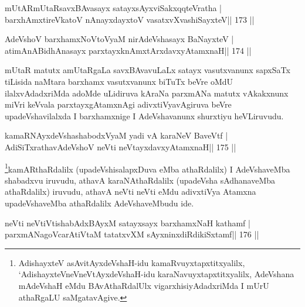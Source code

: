 
\begin{shl}
mUtARmUtaRsavxBAvasayx satayxsAyx\s\s viSakxqqteVratha |
barxhAmxtireVkatoV nAnayxdayxtoV vasatxvXvashiSayxteV\hfill || 173 ||
\end{shl}

\begin{shl}
AdeVshoV barxhamxNoV\s toV\s yaM nirAdeVshasayx BaNayxteV |
atimAnABidhAnasayx parxtayxknAmxtArxdavxyAtamxnaH\hfill || 174 ||
\end{shl}

\begin{artha}
mUtaR matutx amUtaRgaLa savxBAvavuLaLx satayx vasutxvanunx sapxSaTx tiLisida naMtara barxhamx vasutxvanunx biTuTx beVre oMdU ilalxvAdadxriMda adoMde uLidiruva kAraNa parxmANa matutx vAkakxnunx miVri keVvala parxtayxgAtamxnAgi adivxtiVyavAgiruva beVre upadeVshavilalxda I barxhamxnige I AdeVshavanunx shurxtiyu heVLiruvudu.
\end{artha}



\begin{shl}
kamaRNAyxdeVshashabodxV\s yaM yadi vA karaNeV BaveVtf |
AdiSiTxrathavA\s\s deVshoV neVti neVtayxdavxyAtamxnaH\hfill || 175 ||
\end{shl}

\begin{artha}
\footnote{AdishayxteV asAvitAyxdeVshaH-idu kamaRvuyxtapxtitxyalilx,
  `AdishayxteV\s neVneVtAyxdeVshaH-idu karaNavuyxtapxtitxyalilx,
  AdeVshana mAdeVshaH eMdu BAvAthaRdalUlx vigarxhisiyAdadxriMda I
  mUrU athaRgaLU saMgatavAgive.}kamARthaRdalilx (upadeVshisalapxDuva eMba athaRdalilx) I
AdeVshaveMba shabadxvu iruvudu, athavA karaNAthaRdalilx
(upadeVsha sAdhanaveMba athaRdalilx) iruvudu, athavA neVti neVti eMdu
adivxtiVya Atamxna upadeVshaveMba athaRdalilx AdeVshaveMbudu ide.
\end{artha}


\begin{shl}
neVti neVtiVtishabAdxBAyxM satayxsayx barxhamxNaH kathamf |
parxmANagoVcarAtiVtaM tatatxvXM sAyxninxdiRdikiSxtamf\hfill || 176 ||
\end{shl}


